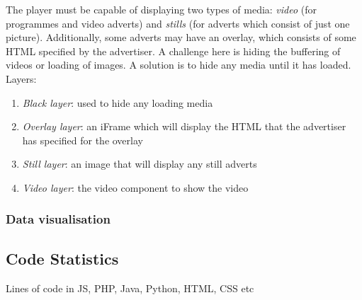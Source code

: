 The player must be capable of displaying two types of media: \textit{video} (for programmes and video adverts) and \textit{stills} (for adverts which consist of just one picture). Additionally, some adverts may have an overlay, which consists of some HTML specified by the advertiser. A challenge here is hiding the buffering of videos or loading of images. A solution is to hide any media until it has loaded. Layers:
\begin{enumerate}
\item \textit{Black layer}: used to hide any loading media
\item \textit{Overlay layer}: an iFrame which will display the HTML that the advertiser has specified for the overlay
\item \textit{Still layer}: an image that will display any still adverts
\item \textit{Video layer}: the video component to show the video
\end{enumerate}

\subsubsection{Data visualisation}


\subsection{Code Statistics}
Lines of code in JS, PHP, Java, Python, HTML, CSS etc

